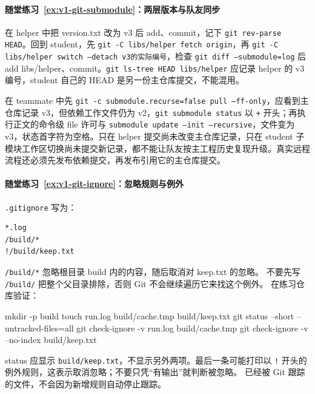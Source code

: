\paragraph*{随堂练习~\ref{ex:v1-git-submodule}：两层版本与队友同步}
\begin{solution}
在 helper 中把 version.txt 改为 v3 后 add、commit，记下 \texttt{git rev-parse HEAD}。回到 student，先 \texttt{git -C libs/helper fetch origin}，再 \texttt{git -C libs/helper switch --detach v3的实际编号}，检查 \texttt{git diff --submodule=log} 后 add libs/helper、commit。\texttt{git ls-tree HEAD libs/helper} 应记录 helper 的 v3 编号，student 自己的 HEAD 是另一份主仓库提交，不能混用。

在 teammate 中先 \texttt{git -c submodule.recurse=false pull --ff-only}，应看到主仓库记录 v3，但依赖工作文件仍为 v2，\texttt{git submodule status} 以 \texttt{+} 开头；再执行正文的命令级 file 许可与 \texttt{submodule update --init --recursive}，文件变为 v3，状态首字符为空格。只在 helper 提交尚未改变主仓库记录，只在 student 子模块工作区切换尚未提交新记录，都不能让队友按主工程历史复现升级。真实远程流程还必须先发布依赖提交，再发布引用它的主仓库提交。
\end{solution}
\paragraph*{随堂练习~\ref{ex:v1-git-ignore}：忽略规则与例外}
\begin{solution}
\texttt{.gitignore} 写为：
\begin{lstlisting}[language={},frame=single]
*.log
/build/*
!/build/keep.txt
\end{lstlisting}
\texttt{/build/*} 忽略根目录 build 内的内容，随后取消对 keep.txt 的忽略。
不要先写 \texttt{/build/} 把整个父目录排除，否则 Git 不会继续遍历它来找这个例外。
在练习仓库验证：

\begin{tbash}
mkdir -p build
touch run.log build/cache.tmp build/keep.txt
git status --short --untracked-files=all
git check-ignore -v run.log build/cache.tmp
git check-ignore -v --no-index build/keep.txt
\end{tbash}

status 应显示 \texttt{build/keep.txt}，不显示另外两项。最后一条可能打印以 \texttt{!} 开头的例外规则，这表示取消忽略；不要只凭“有输出”就判断被忽略。
已经被 Git 跟踪的文件，不会因为新增规则自动停止跟踪。
\end{solution}

